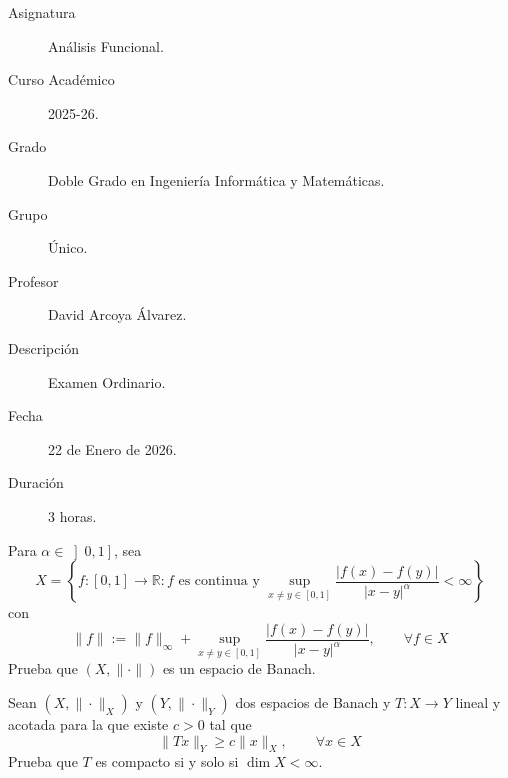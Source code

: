 \documentclass[12pt]{article}
\begin{document}

    
    

    \begin{description}
        \item[Asignatura] Análisis Funcional.
        \item[Curso Académico] 2025-26.
        \item[Grado] Doble Grado en Ingeniería Informática y Matemáticas.
        \item[Grupo] Único.
        \item[Profesor] David Arcoya Álvarez.
        \item[Descripción] Examen Ordinario.
        \item[Fecha] 22 de Enero de 2026.
        \item[Duración] 3 horas.
    
    \end{description}
    \newpage



    \begin{ejercicio}
        Para $\alpha\in \left]0,1\right]$, sea
        \begin{equation*}
            X = \left\{f:[0,1]\to \mathbb{R} : f\text{\ es continua y\ } \sup_{x\neq y \in [0,1]}\frac{|f(x)-f(y)|}{|x-y|^{\alpha}}<\infty\right\}
        \end{equation*}
        con
        \begin{equation*}
        \|f\| := \|f\|_\infty + \sup_{x\neq y \in [0,1]}\frac{|f(x)-f(y)|}{|x-y|^{\alpha}}, \qquad \forall f\in X
        \end{equation*}
        Prueba que $(X,\|\cdot \|)$ es un espacio de Banach.
    \end{ejercicio}

    \begin{ejercicio}
        Sean $(X,\|\cdot \|_X)$ y $(Y,\|\cdot \|_Y)$ dos espacios de Banach y $T:X\to Y$ lineal y acotada para la que existe $c>0$ tal que
        \begin{equation*}
            \|Tx\|_Y \geq c\|x\|_X,\qquad \forall x\in X
        \end{equation*}
        Prueba que $T$ es compacto si y solo si $\dim X < \infty$.
    \end{ejercicio}
\end{document}
